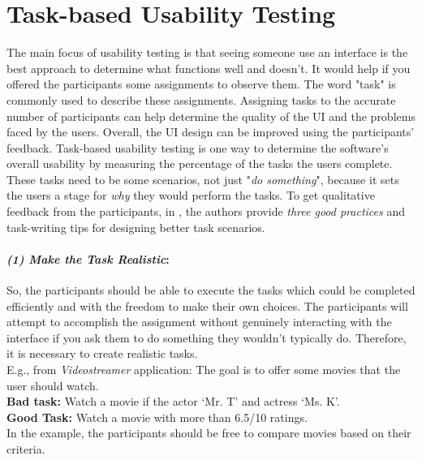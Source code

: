 \section{Task-based Usability Testing}
\label{background:section:task}
The main focus of usability testing is that seeing someone use an interface is the best approach to determine what functions well and doesn't. 
It would help if you offered the participants some assignments to observe them. 
The word "task" is commonly used to describe these assignments.
Assigning tasks to the accurate number of participants can help determine the quality of the UI and the problems faced by the users. 
Overall, the UI design can be improved using the participants' feedback. 
Task-based usability testing is one way to determine the software's overall usability \cite{article:usability:doesburg} by measuring the percentage of the tasks the users complete.
These tasks need to be some scenarios, not just "\textit{do something}", because it sets the users a stage for \textit{why} they would perform the tasks. 
To get qualitative feedback from the participants, in \cite{misc:usability:tasks}, the authors provide \textit{three good practices} and task-writing tips for designing better task scenarios.

\paragraph{\textit{(1) Make the Task Realistic}:}
So, the participants should be able to execute the tasks which could be completed efficiently and with the freedom to make their own choices.
The participants will attempt to accomplish the assignment without genuinely interacting with the interface if you ask them to do something they wouldn't typically do. 
Therefore, it is necessary to create realistic tasks. \\
E.g., from \textit{Videostreamer} application: The goal is to offer some movies that the user should watch. \\
\textbf{Bad task: } Watch a movie if the actor `Mr. T' and actress `Ms. K'. \\
\textbf{Good Task: } Watch a movie with more than 6.5/10 ratings. \\
In the example, the participants should be free to compare movies based on their criteria. 

